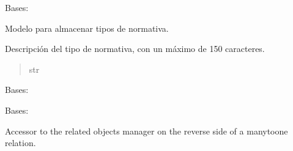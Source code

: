 \documentclass[letterpaper,10pt,spanish]{sphinxmanual}
\begin{document}
\begin{fulllineitems}

\pysigstartsignatures
{}
\pysigstopsignatures
\sphinxAtStartPar
Bases: 

\sphinxAtStartPar
Modelo para almacenar tipos de normativa.


\begin{fulllineitems}

\pysigstartsignatures
{}
\pysigstopsignatures
\sphinxAtStartPar
Descripción del tipo de normativa, con un máximo de 150 caracteres.
\begin{quote}\begin{description}
\sphinxAtStartPar
str

\end{description}\end{quote}

\end{fulllineitems}



\begin{fulllineitems}

\pysigstartsignatures
{}
\pysigstopsignatures
\sphinxAtStartPar
Bases: 

\end{fulllineitems}



\begin{fulllineitems}

\pysigstartsignatures
{}
\pysigstopsignatures
\sphinxAtStartPar
Bases: 

\end{fulllineitems}



\begin{fulllineitems}

\pysigstartsignatures
{}
\pysigstopsignatures
\sphinxAtStartPar
Accessor to the related objects manager on the reverse side of a
many\sphinxhyphen{}to\sphinxhyphen{}one relation.


\end{fulllineitems}
\end{fulllineitems}
\end{document}
